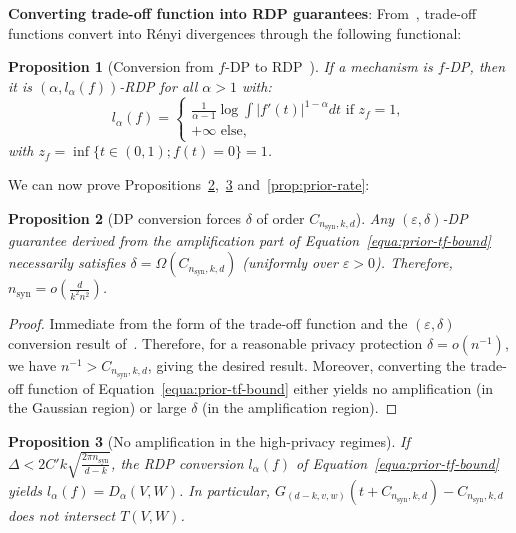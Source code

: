 \documentclass{article}
\theoremstyle{plain}
\newtheorem{proposition}{Proposition}[section]
\theoremstyle{definition}
\theoremstyle{remark}
\begin{document}
\textbf{Converting trade-off function into RDP guarantees}:
From~\citet{Dong2019}, trade-off functions convert into Rényi divergences through the following functional:

\begin{proposition}[Conversion from $f$-DP to RDP~\cite{Dong2019}]
If a mechanism is $f$-DP, then it is $(\alpha,l_\alpha(f))$-RDP for all $\alpha >1$ with:
\[l_\alpha(f) = \begin{cases}
    \frac{1}{\alpha-1}\log \int |f'(t)|^{1-\alpha} dt \text{ if } z_f=1,\\ +\infty \text{ else,}
\end{cases}\]
with $z_f = \inf\{t \in (0,1); f(t) = 0\} =1$.
\end{proposition}

We can now prove Propositions~\ref{prop:prior-dp-delta},~\ref{prop:prior-no-amplification} and~\ref{prop:prior-rate}:


\begin{proposition}[DP conversion forces $\delta$ of order $C_{n_{\text{syn}},k,d}$]
\label{prop:prior-dp-delta}
Any $(\varepsilon,\delta)$-DP guarantee derived from the amplification part of Equation~\ref{equa:prior-tf-bound}
necessarily satisfies $\delta=\Omega(C_{n_{\text{syn}},k,d})$ (uniformly over $\varepsilon > 0$). Therefore, $n_\text{syn} = o\left(\frac{d}{k^2 n^2}\right)$.
\end{proposition}

\begin{proof}
    Immediate from the form of the trade-off function and the $(\varepsilon,\delta)$ conversion result of~\citet{Dong2019}. Therefore, for a reasonable privacy protection $\delta = o(n^{-1})$, we have $n^{-1} > C_{n_{\text{syn}},k,d}$, giving the desired result. Moreover, converting the trade-off function of Equation~\ref{equa:prior-tf-bound} either yields no amplification (in the Gaussian region) or large $\delta$ (in the amplification region).
\end{proof}

\begin{proposition}[No amplification in the high-privacy regimes]
\label{prop:prior-no-amplification}
If $\Delta < 2C'k \sqrt{\frac{2\pi n_{\text{syn}}}{d-k}}$, the RDP conversion $l_\alpha(f)$ of Equation~\ref{equa:prior-tf-bound} yields $l_\alpha(f) = D_\alpha(V,W)$. In particular, $G_{(d-k,v,w)}\left(t + C_{n_{\text{syn}},k,d}\right) -C_{n_{\text{syn}},k,d}$ does not intersect $T(V,W)$.
\end{proposition}
\end{document}
